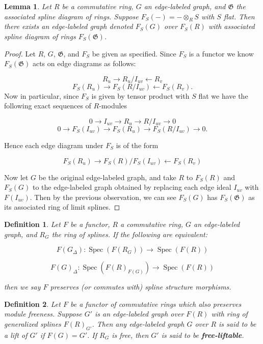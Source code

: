 \documentclass{article}
\DeclareMathOperator{\Spec}{Spec}
\newtheorem{definition}{Definition}
\newtheorem{lemma}{Lemma}
\begin{document}
\begin{lemma}
\label{lma:graph-pushforward}
Let $R$ be a commutative ring, $G$ an edge-labeled graph, and $\mathfrak G$ the associated spline diagram of rings. Suppose $F_S(-) = - \otimes_R S$ with $S$ flat. Then there exists an edge-labeled graph denoted $F_S(G)$ over $F_S(R)$ with associated spline diagram of rings $F_S(\mathfrak G)$.
\end{lemma}
\begin{proof}
Let $R$, $G$, $\mathfrak G$, and $F_S$ be given as specified. Since $F_S$ is a functor we know $F_S(\mathfrak G)$ acts on edge diagrams as follows:

\[
R_u \rightarrow R_u/I_{uv} \leftarrow R_v
\]
\[
F_S(R_u) \rightarrow F_S(R/I_{uv}) \leftarrow F_S(R_v).
\]
Now in particular, since $F_S$ is given by tensor product with $S$ flat we have the following exact sequences of $R$-modules

\[
0 \rightarrow I_{uv} \rightarrow R_u \rightarrow R/I_{uv} \rightarrow 0
\]
\[
0 \rightarrow F_S(I_{uv}) \rightarrow F_S(R_u) \rightarrow F_S(R/I_{uv}) \rightarrow 0.
\]

Hence each edge diagram under $F_S$ is of the form

\[
F_S(R_u) \rightarrow F_S(R)/F_S(I_{uv}) \leftarrow F_S(R_v) 
\]

Now let $G$ be the original edge-labeled graph, and take $R$ to $F_S(R)$ and $F_S(G)$ to the edge-labeled graph obtained by replacing each edge ideal $I_{uv}$ with $F(I_{uv})$. Then by the previous observation, we can see $F_S(G)$ has $F_S(\mathfrak G)$ as its associated ring of limit splines. 
\end{proof}

\begin{definition}
Let $F$ be a functor, $R$ a commutative ring, $G$ an edge-labeled graph, and $R_G$ the ring of splines. If the following are equivalent:

\[ 
F(G_\Delta) : \Spec(F(R_G)) \rightarrow \Spec(F(R))
\]

\[
F(G)_\Delta : \Spec(F(R)_{F(G)}) \rightarrow \Spec(F(R))
\]

then we say $F$ preserves (or commutes with) spline structure morphisms.
\end{definition}

\begin{definition}
Let $F$ be a functor of commutative rings which also preserves module freeness. Suppose $G'$ is an edge-labeled graph over $F(R)$ with ring of generalized splines $F(R)_{G'}$. Then any edge-labeled graph $G$ over $R$ is said to be a lift of $G'$ if $F(G)=G'$. If $R_G$ is free, then $G'$ is said to be \textbf{free-liftable}. 
\end{definition}
\end{document}
